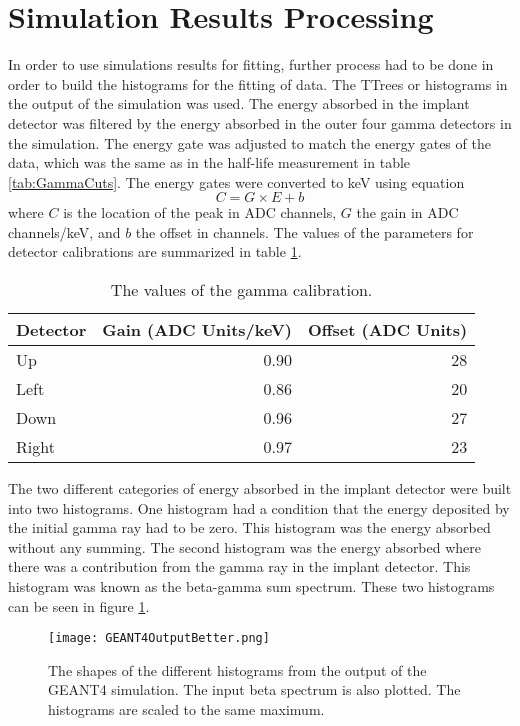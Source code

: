 \documentclass[../MaxHughesThesis.tex]{subfiles}
\begin{document}
\section{Simulation Results Processing}
In order to use simulations results for fitting, further process had to be done in order to build the histograms for the fitting of data.
The TTrees or histograms in the output of the simulation was used.
The energy absorbed in the implant detector was filtered by the energy absorbed in the outer four gamma detectors in the simulation.
The energy gate was adjusted to match the energy gates of the data, which was the same as in the half-life measurement in table \ref{tab:GammaCuts}.
The energy gates were converted to keV using equation
\begin{equation}
        C = G \times E + b
        \label{eq:cal}
\end{equation}
where $C$ is the location of the peak in ADC channels, $G$ the gain in ADC channels/keV, and $b$ the offset in channels.
The values of the parameters for detector calibrations are summarized in table \ref{tab:gammadetcal}.

\begin{table}[!hbt]
        \centering
        \caption{The values of the gamma calibration.}
                \begin{tabular}{lrr}
                Detector & Gain (ADC Units/keV) & Offset (ADC Units) \\ \hline
                Up & 0.90 & 28 \\
                Left & 0.86 & 20 \\
                Down & 0.96 & 27 \\
                Right & 0.97 & 23
                \end{tabular}
                \label{tab:gammadetcal}
\end{table}
The two different categories of energy absorbed in the implant detector were built into two histograms.
One histogram had a condition that the energy deposited by the initial gamma ray had to be zero.
This histogram was the energy absorbed without any summing.
The second histogram was the energy absorbed where there was a contribution from the gamma ray in the implant detector.
This histogram was known as the beta-gamma sum spectrum.
These two histograms can be seen in figure \ref{fig:GEANT4Hists}.
\begin{figure}[!htb]
        \centerline{\texttt{[image: GEANT4OutputBetter.png]}}
        \caption{The shapes of the different histograms from the output of the GEANT4 simulation.
                 The input beta spectrum is also plotted.
                 The histograms are scaled to the same maximum.}
        \label{fig:GEANT4Hists}
\end{figure}
\end{document}
